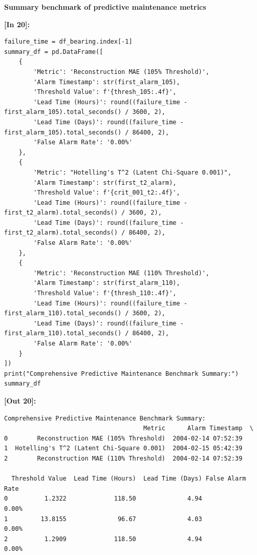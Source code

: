 \vspace{0.2em}
\vspace{0.3em}
\begin{tcolorbox}[colback=gray!5!white,colframe=gray!50!black,boxrule=0.5pt,arc=2pt,left=5pt,right=5pt,top=2pt,bottom=2pt,unbreakable,before upper={\sloppy\raggedright}]
{\small\bfseries Summary benchmark of predictive maintenance metrics\par}
\end{tcolorbox}
\vspace{0.2em}
\vspace{0.4em}
\noindent\textbf{\small [In 20]:}
\begin{lstlisting}[style=pycode]
failure_time = df_bearing.index[-1]
summary_df = pd.DataFrame([
    {
        'Metric': 'Reconstruction MAE (105% Threshold)',
        'Alarm Timestamp': str(first_alarm_105),
        'Threshold Value': f'{thresh_105:.4f}',
        'Lead Time (Hours)': round((failure_time - first_alarm_105).total_seconds() / 3600, 2),
        'Lead Time (Days)': round((failure_time - first_alarm_105).total_seconds() / 86400, 2),
        'False Alarm Rate': '0.00%'
    },
    {
        'Metric': "Hotelling's T^2 (Latent Chi-Square 0.001)",
        'Alarm Timestamp': str(first_t2_alarm),
        'Threshold Value': f'{crit_001_t2:.4f}',
        'Lead Time (Hours)': round((failure_time - first_t2_alarm).total_seconds() / 3600, 2),
        'Lead Time (Days)': round((failure_time - first_t2_alarm).total_seconds() / 86400, 2),
        'False Alarm Rate': '0.00%'
    },
    {
        'Metric': 'Reconstruction MAE (110% Threshold)',
        'Alarm Timestamp': str(first_alarm_110),
        'Threshold Value': f'{thresh_110:.4f}',
        'Lead Time (Hours)': round((failure_time - first_alarm_110).total_seconds() / 3600, 2),
        'Lead Time (Days)': round((failure_time - first_alarm_110).total_seconds() / 86400, 2),
        'False Alarm Rate': '0.00%'
    }
])
print("Comprehensive Predictive Maintenance Benchmark Summary:")
summary_df
\end{lstlisting}
\vspace{0.2em}
\noindent\textbf{\small [Out 20]:}
\begin{lstlisting}[style=output]
Comprehensive Predictive Maintenance Benchmark Summary:
                                      Metric      Alarm Timestamp  \
0        Reconstruction MAE (105% Threshold)  2004-02-14 07:52:39   
1  Hotelling's T^2 (Latent Chi-Square 0.001)  2004-02-15 05:42:39   
2        Reconstruction MAE (110% Threshold)  2004-02-14 07:52:39   

  Threshold Value  Lead Time (Hours)  Lead Time (Days) False Alarm Rate  
0          1.2322             118.50              4.94            0.00%  
1         13.8155              96.67              4.03            0.00%  
2          1.2909             118.50              4.94            0.00%
\end{lstlisting}
